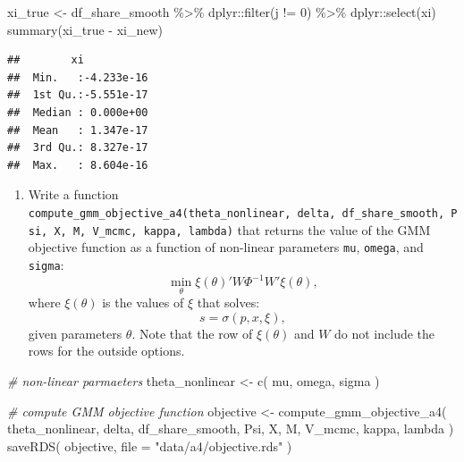 \documentclass[
]{book}
\newenvironment{Shaded}{\begin{snugshade}}{\end{snugshade}}
\newcommand{\AttributeTok}[1]{\textcolor[rgb]{0.77,0.63,0.00}{#1}}
\newcommand{\CommentTok}[1]{\textcolor[rgb]{0.56,0.35,0.01}{\textit{#1}}}
\newcommand{\DecValTok}[1]{\textcolor[rgb]{0.00,0.00,0.81}{#1}}
\newcommand{\FunctionTok}[1]{\textcolor[rgb]{0.00,0.00,0.00}{#1}}
\newcommand{\NormalTok}[1]{#1}
\newcommand{\OtherTok}[1]{\textcolor[rgb]{0.56,0.35,0.01}{#1}}
\newcommand{\SpecialCharTok}[1]{\textcolor[rgb]{0.00,0.00,0.00}{#1}}
\newcommand{\StringTok}[1]{\textcolor[rgb]{0.31,0.60,0.02}{#1}}
\providecommand{\tightlist}{%
  \setlength{\itemsep}{0pt}\setlength{\parskip}{0pt}}
\begin{document}
\begin{Shaded}
\begin{Highlighting}[]
\NormalTok{xi\_true }\OtherTok{\textless{}{-}}
\NormalTok{  df\_share\_smooth }\SpecialCharTok{\%\textgreater{}\%}
\NormalTok{  dplyr}\SpecialCharTok{::}\FunctionTok{filter}\NormalTok{(j }\SpecialCharTok{!=} \DecValTok{0}\NormalTok{) }\SpecialCharTok{\%\textgreater{}\%}
\NormalTok{  dplyr}\SpecialCharTok{::}\FunctionTok{select}\NormalTok{(xi)}
\FunctionTok{summary}\NormalTok{(xi\_true }\SpecialCharTok{{-}}\NormalTok{ xi\_new)}
\end{Highlighting}
\end{Shaded}

\begin{verbatim}
##        xi            
##  Min.   :-4.233e-16  
##  1st Qu.:-5.551e-17  
##  Median : 0.000e+00  
##  Mean   : 1.347e-17  
##  3rd Qu.: 8.327e-17  
##  Max.   : 8.604e-16
\end{verbatim}

\begin{enumerate}
\def\labelenumi{\arabic{enumi}.}
\setcounter{enumi}{10}
\tightlist
\item
  Write a function \texttt{compute\_gmm\_objective\_a4(theta\_nonlinear,\ delta,\ df\_share\_smooth,\ Psi,\ X,\ M,\ V\_mcmc,\ kappa,\ lambda)} that returns the value of the GMM objective function as a function of non-linear parameters \texttt{mu}, \texttt{omega}, and \texttt{sigma}:
  \[
  \min_{\theta} \xi(\theta)' W \Phi^{-1} W' \xi(\theta),
  \]
  where \(\xi(\theta)\) is the values of \(\xi\) that solves:
  \[
  s = \sigma(p, x, \xi),
  \]
  given parameters \(\theta\). Note that the row of \(\xi(\theta)\) and \(W\) do not include the rows for the outside options.
\end{enumerate}

\begin{Shaded}
\begin{Highlighting}[]
\CommentTok{\# non{-}linear parmaeters}
\NormalTok{theta\_nonlinear }\OtherTok{\textless{}{-}} 
  \FunctionTok{c}\NormalTok{(}
\NormalTok{    mu, }
\NormalTok{    omega, }
\NormalTok{    sigma}
\NormalTok{    )}
\end{Highlighting}
\end{Shaded}

\begin{Shaded}
\begin{Highlighting}[]
\CommentTok{\# compute GMM objective function}
\NormalTok{objective }\OtherTok{\textless{}{-}}
  \FunctionTok{compute\_gmm\_objective\_a4}\NormalTok{(}
\NormalTok{    theta\_nonlinear, }
\NormalTok{    delta, }
\NormalTok{    df\_share\_smooth, }
\NormalTok{    Psi, }
\NormalTok{    X, }
\NormalTok{    M, }
\NormalTok{    V\_mcmc, }
\NormalTok{    kappa, }
\NormalTok{    lambda}
\NormalTok{    ) }
\FunctionTok{saveRDS}\NormalTok{(}
\NormalTok{  objective, }
  \AttributeTok{file =} \StringTok{"data/a4/objective.rds"}
\NormalTok{  )}
\end{Highlighting}
\end{Shaded}
\end{document}

